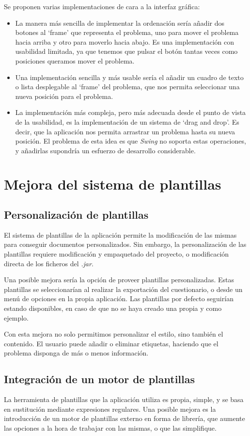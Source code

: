 Se proponen varias implementaciones de cara a la interfaz gráfica:
\begin{itemize}
	\item La manera más sencilla de implementar la ordenación sería añadir dos botones al `frame' que representa el problema, uno para mover el problema hacia arriba y otro para moverlo hacia abajo.
	Es una implementación con usabilidad limitada, ya que tenemos que pulsar el botón tantas veces como posiciones queramos mover el problema.
	\item Una implementación sencilla y más usable sería el añadir un cuadro de texto o lista desplegable al `frame' del problema, que nos permita seleccionar una nueva posición para el problema.
	\item La implementación más compleja, pero más adecuada desde el punto de vista de la usabilidad, es la implementación de un sistema de `drag and drop'.
	Es decir, que la aplicación nos permita arrastrar un problema hasta su nueva posición.
	El problema de esta idea es que \emph{Swing} no soporta estas operaciones, y añadirlas supondría un esfuerzo de desarrollo considerable.
\end{itemize}

\section{Mejora del sistema de plantillas}
\subsection{Personalización de plantillas}
El sistema de plantillas de la aplicación permite la modificación de las mismas para conseguir documentos personalizados.
Sin embargo, la personalización de las plantillas requiere modificación y empaquetado del proyecto, o modificación directa de los ficheros del \emph{.jar}.

Una posible mejora sería la opción de proveer plantillas personalizadas.
Estas plantillas se seleccionarían al realizar la exportación del cuestionario, o desde un menú de opciones en la propia aplicación.
Las plantillas por defecto seguirían estando disponibles, en caso de que no se haya creado una propia y como ejemplo.

Con esta mejora no solo permitimos personalizar el estilo, sino también el contenido.
El usuario puede añadir o eliminar etiquetas, haciendo que el problema disponga de más o menos información.

\subsection{Integración de un motor de plantillas}
La herramienta de plantillas que la aplicación utiliza es propia, simple, y se basa en sustitución mediante expresiones regulares.
Una posible mejora es la introducción de un motor de plantillas externo en forma de librería, que aumente las opciones a la hora de trabajar con las mismas, o que las simplifique.

